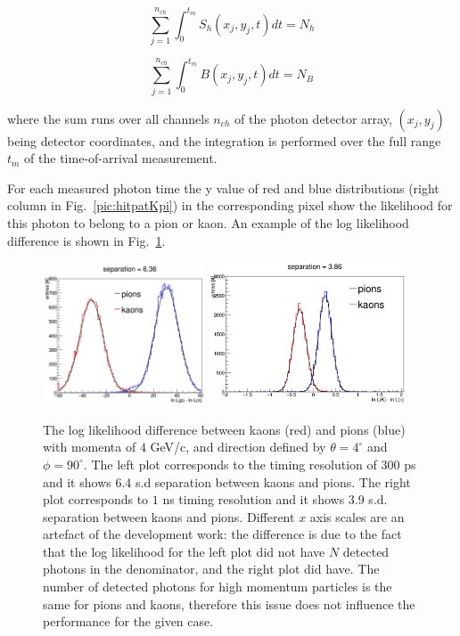 \begin{equation}
\sum_{j=1}^{n_{ch}} \int_{0}^{t_{m}} S_{h}(x_{j}, y_{j}, t) dt = N_{h}
\label{eq:norm1}
\end{equation}

\begin{equation}
\sum_{j=1}^{n_{ch}} \int_{0}^{t_{m}} B(x_{j}, y_{j}, t) dt = N_{B}
\label{eq:norm2}
\end{equation}

\noindent where the sum runs over all channels $n_{ch}$ of the photon detector array, $(x_{j}, y_{j})$ being detector coordinates, and the integration is performed over the full range $t_{m}$ of the time-of-arrival measurement.

For each measured photon time the y value of red and blue distributions (right column in Fig.~\ref{pic:hitpatKpi}) in the corresponding pixel show the likelihood for this photon to belong to a pion or kaon. An example of the log likelihood difference is shown in Fig.~\ref{pic:sepTI}.

\begin{figure}[!h]
\centering
\includegraphics[width=0.43\textwidth]{pics/sepTI300.png} \hspace{0.5cm} \includegraphics[width=0.52\textwidth]{pics/sepTI1000.png}
\caption{\label{pic:sepTI}
The log likelihood difference between kaons (red) and pions (blue) with momenta of $4$ GeV/c, and direction defined by $\theta = 4^{\circ}$ and $\phi = 90^{\circ}$. The left plot corresponds to the timing resolution of $300$ ps and it shows 6.4 s.d separation between kaons and pions. The right plot corresponds to $1$ ns timing resolution and it shows 3.9 s.d. separation between kaons and pions. \newline \footnotesize{Different $x$ axis scales are an artefact of the development work: the difference is due to the fact that the log likelihood for the left plot did not have $N$ detected photons in the denominator, and the right plot did have. The number of detected photons for high momentum particles is the same for pions and kaons, therefore this issue does not influence the performance for the given case. }
}
\end{figure}

